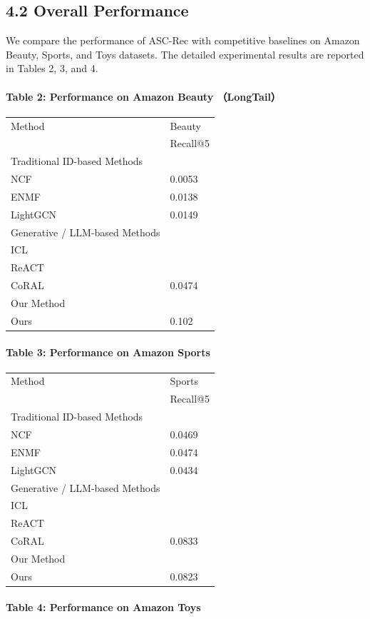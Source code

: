 \documentclass[]{article}
\let\oldparagraph\paragraph
\renewcommand{\paragraph}[1]{\oldparagraph{#1}\mbox{}}
\begin{document}
\hypertarget{overall-performance}{%
\subsection{4.2 Overall Performance}\label{overall-performance}}

We compare the performance of ASC-Rec with competitive baselines on
Amazon Beauty, Sports, and Toys datasets. The detailed experimental
results are reported in Tables 2, 3, and 4.

\hypertarget{table-2-performance-on-amazon-beauty-longtail}{%
\paragraph{Table 2: Performance on Amazon Beauty
（LongTail）}\label{table-2-performance-on-amazon-beauty-longtail}}

\begin{longtable}[]{@{}ll@{}}
\toprule
\endhead
Method & Beauty\tabularnewline
& Recall@5\tabularnewline
Traditional ID-based Methods\tabularnewline
NCF & 0.0053\tabularnewline
ENMF & 0.0138\tabularnewline
LightGCN & 0.0149\tabularnewline
Generative / LLM-based Methods\tabularnewline
ICL &\tabularnewline
ReACT &\tabularnewline
CoRAL & 0.0474\tabularnewline
Our Method\tabularnewline
Ours & 0.102\tabularnewline
\bottomrule
\end{longtable}

\hypertarget{table-3-performance-on-amazon-sports}{%
\paragraph{Table 3: Performance on Amazon Sports
}\label{table-3-performance-on-amazon-sports}}

\begin{longtable}[]{@{}ll@{}}
\toprule
\endhead
Method & Sports\tabularnewline
& Recall@5\tabularnewline
Traditional ID-based Methods\tabularnewline
NCF & 0.0469\tabularnewline
ENMF & 0.0474\tabularnewline
LightGCN & 0.0434\tabularnewline
Generative / LLM-based Methods\tabularnewline
ICL &\tabularnewline
ReACT &\tabularnewline
CoRAL & 0.0833\tabularnewline
Our Method\tabularnewline
Ours & 0.0823\tabularnewline
\bottomrule
\end{longtable}

\hypertarget{table-4-performance-on-amazon-toys}{%
\paragraph{Table 4: Performance on Amazon Toys
}\label{table-4-performance-on-amazon-toys}}
\end{document}
